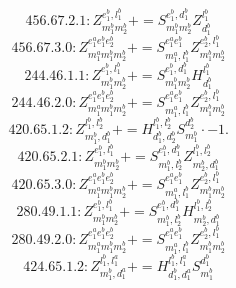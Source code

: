 \documentclass[letterpaper,10pt,fleqn,leqno,onecolumn]{article}
\begin{document}
\begin{equation} \;\;\;\;\;\;  456.67.2.1: Z^{e_{1}^{b},l_{1}^{b}}_{m_{1}^{b}m_{2}^{b}}+=S^{e_{1}^{b},d_{1}^{b}}_{m_{1}^{b}m_{2}^{b}}Z^{l_{1}^{b}}_{d_{1}^{b}} \end{equation}
\begin{equation} \;\;\;\;\;\;  456.67.3.0: Z^{e_{1}^{a}e_{1}^{b}e_{2}^{b}}_{m_{1}^{a}m_{1}^{b}m_{2}^{b}}+=S^{e_{1}^{a}e_{1}^{b}}_{m_{1}^{a},l_{1}^{b}}Z^{e_{2}^{b},l_{1}^{b}}_{m_{1}^{b}m_{2}^{b}} \end{equation}
\begin{equation} \;\;\;\;\;\;  244.46.1.1: Z^{e_{1}^{b},l_{1}^{b}}_{m_{1}^{b}m_{2}^{b}}+=S^{e_{1}^{b},d_{1}^{b}}_{m_{1}^{b}m_{2}^{b}}H^{l_{1}^{b}}_{d_{1}^{b}} \end{equation}
\begin{equation} \;\;\;\;\;\;  244.46.2.0: Z^{e_{1}^{a}e_{1}^{b}e_{2}^{b}}_{m_{1}^{a}m_{1}^{b}m_{2}^{b}}+=S^{e_{1}^{a}e_{1}^{b}}_{m_{1}^{a},l_{1}^{b}}Z^{e_{2}^{b},l_{1}^{b}}_{m_{1}^{b}m_{2}^{b}} \end{equation}
\begin{equation} \;\;\;\;\;\;  420.65.1.2: Z^{l_{1}^{b},l_{2}^{b}}_{m_{1}^{b},d_{1}^{b}}+=H^{l_{1}^{b},l_{2}^{b}}_{d_{1}^{b},d_{2}^{b}}S^{d_{2}^{b}}_{m_{1}^{b}}\cdot -1. \end{equation}
\begin{equation} \;\;\;\;\;\;  420.65.2.1: Z^{e_{1}^{b},l_{1}^{b}}_{m_{1}^{b}m_{2}^{b}}+=S^{e_{1}^{b},d_{1}^{b}}_{m_{1}^{b},l_{2}^{b}}Z^{l_{1}^{b},l_{2}^{b}}_{m_{2}^{b},d_{1}^{b}} \end{equation}
\begin{equation} \;\;\;\;\;\;  420.65.3.0: Z^{e_{1}^{a}e_{1}^{b}e_{2}^{b}}_{m_{1}^{a}m_{1}^{b}m_{2}^{b}}+=S^{e_{1}^{a}e_{1}^{b}}_{m_{1}^{a},l_{1}^{b}}Z^{e_{2}^{b},l_{1}^{b}}_{m_{1}^{b}m_{2}^{b}} \end{equation}
\begin{equation} \;\;\;\;\;\;  280.49.1.1: Z^{e_{1}^{b},l_{1}^{b}}_{m_{1}^{b}m_{2}^{b}}+=S^{e_{1}^{b},d_{1}^{b}}_{m_{1}^{b},l_{2}^{b}}H^{l_{1}^{b},l_{2}^{b}}_{m_{2}^{b},d_{1}^{b}} \end{equation}
\begin{equation} \;\;\;\;\;\;  280.49.2.0: Z^{e_{1}^{a}e_{1}^{b}e_{2}^{b}}_{m_{1}^{a}m_{1}^{b}m_{2}^{b}}+=S^{e_{1}^{a}e_{1}^{b}}_{m_{1}^{a},l_{1}^{b}}Z^{e_{2}^{b},l_{1}^{b}}_{m_{1}^{b}m_{2}^{b}} \end{equation}
\begin{equation} \;\;\;\;\;\;  424.65.1.2: Z^{l_{1}^{b},l_{1}^{a}}_{m_{1}^{b},d_{1}^{a}}+=H^{l_{1}^{b},l_{1}^{a}}_{d_{1}^{b},d_{1}^{a}}S^{d_{1}^{b}}_{m_{1}^{b}} \end{equation}
\end{document}
